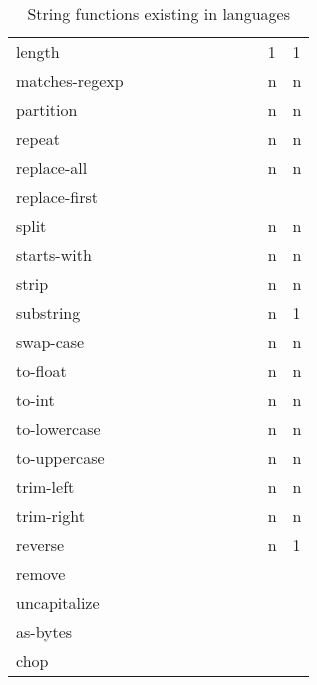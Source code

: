 \documentclass[anonymous,sigplan,review,11pt,nonacm,natbib=false]{acmart}
\begin{document}
\begin{table*}
\begin{tabular}{lllllllllll}
            length &  &  &  &  &  & &  &  & 1 & 1 \\

            matches-regexp &  &  &  &  &  & &  &  & n & n \\

            partition &  &  &  &  &  & &  &  & n & n \\

            repeat &  &  &  &  &  & &  &  & n & n \\

            replace-all &  &  &  &  &  & &  &  & n & n \\

            replace-first &  &  &  &  &  &  &  &  &  & \\

            split &  &  &  &  &  & &  &  & n & n \\

            starts-with &  &  &  &  &  & &  &  & n & n \\

            strip &  &  &  &  &  & &  &  & n & n \\

            substring &  &  &  &  &  & &  &  & n & 1 \\

            swap-case &  &  &  &  &  & &  &  & n & n \\

            to-float &  &  &  &  &  & &  &  & n & n \\

            to-int &  &  &  &  &  & &  &  & n & n \\

            to-lowercase &  &  &  &  &  & &  &  & n & n \\

            to-uppercase &  &  &  &  &  & &  &  & n & n \\

            trim-left &  &  &  &  &  & &  &  & n & n \\

            trim-right &  &  &  &  &  & &  &  & n & n \\

            reverse &  &  &  &  &  & &  &  & n & 1 \\

            remove &  &  &  &  &  & &  &  &  & \\

            uncapitalize &  &  &  &  &  & &  &  &  & \\

            as-bytes &  &  &  &  &  & &  &  &  & \\

            chop &  &  &  &  &  & &  &  &  & \\ \hline
        \end{tabular}
        \caption{String functions existing in languages}
        \label{tab:my_label}
    \end{table*}
\end{document}
